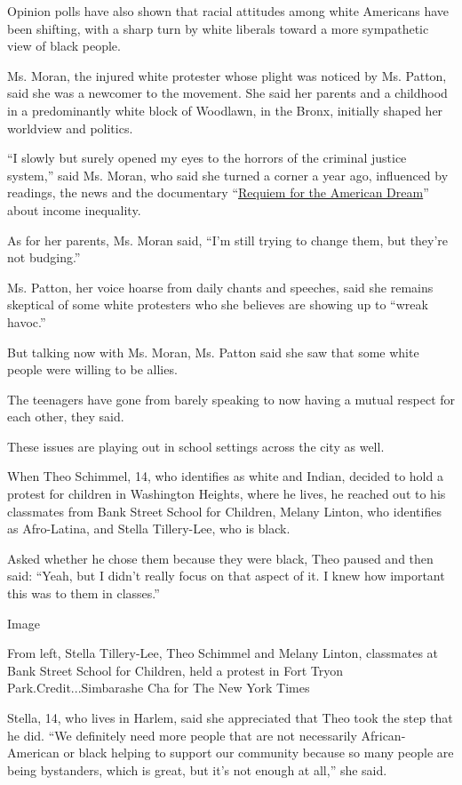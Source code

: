 Opinion polls have also shown that racial attitudes among white
Americans have been shifting, with a sharp turn by white liberals toward
a more sympathetic view of black people.

Ms. Moran, the injured white protester whose plight was noticed by Ms.
Patton, said she was a newcomer to the movement. She said her parents
and a childhood in a predominantly white block of Woodlawn, in the
Bronx, initially shaped her worldview and politics.

``I slowly but surely opened my eyes to the horrors of the criminal
justice system,'' said Ms. Moran, who said she turned a corner a year
ago, influenced by readings, the news and the documentary
``\href{https://www.nytimes3xbfgragh.onion/2016/01/29/movies/review-noam-chomsky-focuses-on-financial-inequality.html}{Requiem
for the American Dream}'' about income inequality.

As for her parents, Ms. Moran said, ``I'm still trying to change them,
but they're not budging.''

Ms. Patton, her voice hoarse from daily chants and speeches, said she
remains skeptical of some white protesters who she believes are showing
up to ``wreak havoc.''

But talking now with Ms. Moran, Ms. Patton said she saw that some white
people were willing to be allies.

The teenagers have gone from barely speaking to now having a mutual
respect for each other, they said.

These issues are playing out in school settings across the city as well.

When Theo Schimmel, 14, who identifies as white and Indian, decided to
hold a protest for children in Washington Heights, where he lives, he
reached out to his classmates from Bank Street School for Children,
Melany Linton, who identifies as Afro-Latina, and Stella Tillery-Lee,
who is black.

Asked whether he chose them because they were black, Theo paused and
then said: ``Yeah, but I didn't really focus on that aspect of it. I
knew how important this was to them in classes.''

Image

From left, Stella Tillery-Lee, Theo Schimmel and Melany Linton,
classmates at Bank Street School for Children, held a protest in Fort
Tryon Park.Credit...Simbarashe Cha for The New York Times

Stella, 14, who lives in Harlem, said she appreciated that Theo took the
step that he did. ``We definitely need more people that are not
necessarily African-American or black helping to support our community
because so many people are being bystanders, which is great, but it's
not enough at all,'' she said.

